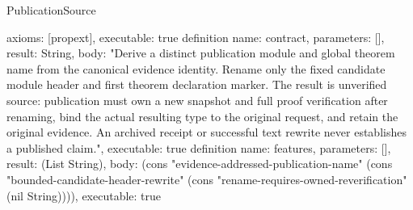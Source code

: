 \begin{lexlean}{PublicationSource}
\begin{semanticmodule}
{ axioms: [propext],
 executable: true
}
definition{
 name: contract,
 parameters: [],
 result: String,
 body: "Derive a distinct publication module and global theorem name from the canonical evidence identity. Rename only the fixed candidate module header and first theorem declaration marker. The result is unverified source: publication must own a new snapshot and full proof verification after renaming, bind the actual resulting type to the original request, and retain the original evidence. An archived receipt or successful text rewrite never establishes a published claim.",
 executable: true
}
definition{
 name: features,
 parameters: [],
 result: (List String),
 body: (cons "evidence-addressed-publication-name" (cons "bounded-candidate-header-rewrite" (cons "rename-requires-owned-reverification" (nil String)))),
 executable: true
}
\end{semanticmodule}
\end{lexlean}
